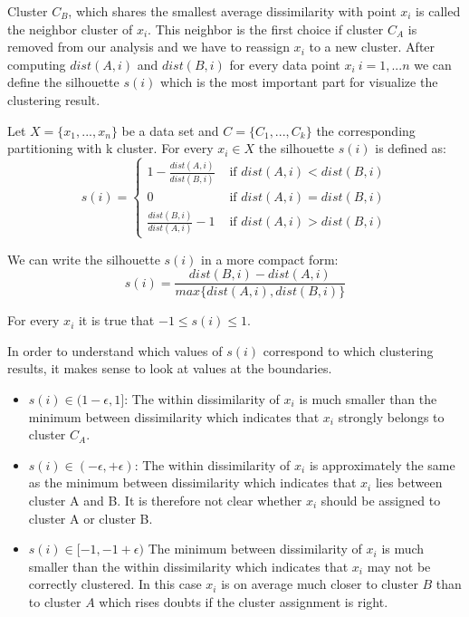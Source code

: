 Cluster $C_B$, which shares the smallest average dissimilarity with point $x_i$ is called the neighbor cluster of $x_i$. This neighbor is the first choice if cluster $C_A$ is removed from our analysis and we have to reassign $x_i$ to a new cluster. After computing $dist(A,i)$ and $dist(B,i)$ for every data point $x_i~i=1,...n$ we can define the silhouette $s(i)$ which is the most important part for visualize the clustering result.

\begin{definition}
Let $X=\{x_1, ..., x_n\}$ be a data set and $C=\{C_1, ..., C_k\}$ the corresponding partitioning with k cluster. For every $x_i \in X$ the silhouette $s(i)$ is defined as:
	\begin{equation*}\label{equ:silhouette_long}
	s(i) = \begin{cases}
		1-\frac{dist(A,i)}{dist(B,i)} 	& \text{ if } dist(A,i) < dist(B,i)\\
		0 					& \text{ if } dist(A,i) = dist(B,i)\\
		\frac{dist(B,i)}{dist(A,i)}-1 	& \text{ if } dist(A,i) > dist(B,i)
	\end{cases}
	\end{equation*}
\end{definition}

\begin{remark}
	We can write the silhouette $s(i)$ in a more compact form: 
	\begin{equation*}
		s(i) = \frac{dist(B,i) - dist(A,i)}{max\{ dist(A,i), dist(B,i) \}}
	\end{equation*}
\end{remark}

\begin{remark}
	For every $x_i$ it is true that $-1 \leq s(i) \leq 1$.
\end{remark}

\begin{remark}
	In order to understand which values of $s(i)$ correspond to which clustering results, it makes sense to look at values at the boundaries. 
	\begin{itemize}[label=$\star$]
		\item $s(i) \in (1 - \epsilon, 1]$: The within dissimilarity of $x_i$ is much smaller than the minimum between dissimilarity which indicates that $x_i$ strongly belongs to cluster $C_A$.
		\item $s(i) \in (-\epsilon, + \epsilon)$: The within dissimilarity of $x_i$ is approximately the same as the minimum between dissimilarity which indicates that $x_i$ lies between cluster A and B. It is therefore not clear whether $x_i$ should be assigned to cluster A or cluster B. 
		\item $s(i) \in [-1, -1 + \epsilon)$ The minimum between dissimilarity of $x_i$ is much smaller than the within dissimilarity which indicates that $x_i$ may not be correctly clustered. In this case $x_i$ is on average much closer to cluster $B$ than to cluster $A$ which rises doubts if the cluster assignment is right. 
	\end{itemize}
\end{remark}

